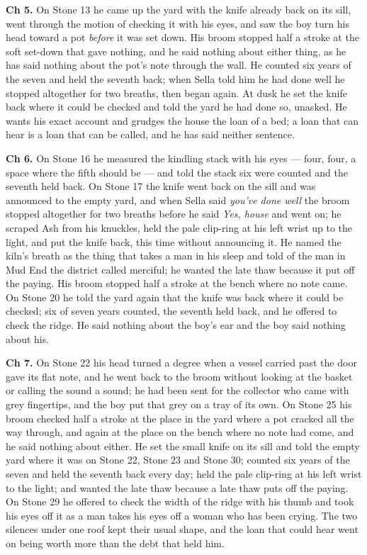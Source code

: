 \documentclass{design/chronicle}
\begin{document}
{\textbf{Ch 5.} On Stone 13 he came up the yard with the knife already back on its sill, went through the motion of checking it with his eyes, and saw the boy turn his head toward a pot \emph{before} it was set down. His broom stopped half a stroke at the soft set-down that gave nothing, and he said nothing about either thing, as he has said nothing about the pot’s note through the wall. He counted six years of the seven and held the seventh back; when Sella told him he had done well he stopped altogether for two breaths, then began again. At dusk he set the knife back where it could be checked and told the yard he had done so, unasked. He wants his exact account and grudges the house the loan of a bed; a loan that can hear is a loan that can be called, and he has said neither sentence.

\textbf{Ch 6.} On Stone 16 he measured the kindling stack with his eyes --- four, four, a space where the fifth should be --- and told the stack six were counted and the seventh held back. On Stone 17 the knife went back on the sill and was announced to the empty yard, and when Sella said \emph{you’ve done well} the broom stopped altogether for two breaths before he said \emph{Yes, house} and went on; he scraped Ash from his knuckles, held the pale clip-ring at his left wrist up to the light, and put the knife back, this time without announcing it. He named the kiln’s breath as the thing that takes a man in his sleep and told of the man in Mud End the district called merciful; he wanted the late thaw because it put off the paying. His broom stopped half a stroke at the bench where no note came. On Stone 20 he told the yard again that the knife was back where it could be checked; six of seven years counted, the seventh held back, and he offered to check the ridge. He said nothing about the boy’s ear and the boy said nothing about his.

\textbf{Ch 7.} On Stone 22 his head turned a degree when a vessel carried past the door gave its flat note, and he went back to the broom without looking at the basket or calling the sound a sound; he had been sent for the collector who came with grey fingertips, and the boy put that grey on a tray of its own. On Stone 25 his broom checked half a stroke at the place in the yard where a pot cracked all the way through, and again at the place on the bench where no note had come, and he said nothing about either. He set the small knife on its sill and told the empty yard where it was on Stone 22, Stone 23 and Stone 30; counted six years of the seven and held the seventh back every day; held the pale clip-ring at his left wrist to the light; and wanted the late thaw because a late thaw puts off the paying. On Stone 29 he offered to check the width of the ridge with his thumb and took his eyes off it as a man takes his eyes off a woman who has been crying. The two silences under one roof kept their usual shape, and the loan that could hear went on being worth more than the debt that held him.

}
\end{document}

